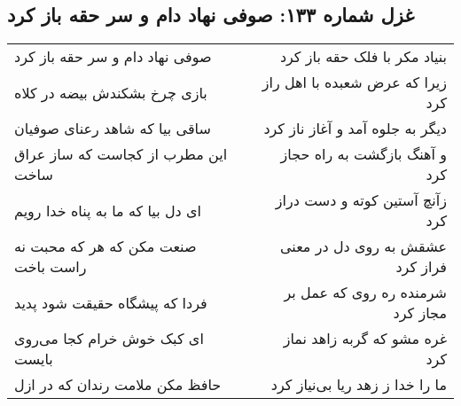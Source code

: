 \begin{center}
\section*{غزل شماره ۱۳۳: صوفی نهاد دام و سر حقه باز کرد}
\label{sec:sh133}
\begin{longtable}{l p{0.5cm} r}
صوفی نهاد دام و سر حقه باز کرد
&&
بنیاد مکر با فلک حقه باز کرد
\\
بازی چرخ بشکندش بیضه در کلاه
&&
زیرا که عرض شعبده با اهل راز کرد
\\
ساقی بیا که شاهد رعنای صوفیان
&&
دیگر به جلوه آمد و آغاز ناز کرد
\\
این مطرب از کجاست که ساز عراق ساخت
&&
و آهنگ بازگشت به راه حجاز کرد
\\
ای دل بیا که ما به پناه خدا رویم
&&
زآنچ آستین کوته و دست دراز کرد
\\
صنعت مکن که هر که محبت نه راست باخت
&&
عشقش به روی دل در معنی فراز کرد
\\
فردا که پیشگاه حقیقت شود پدید
&&
شرمنده ره روی که عمل بر مجاز کرد
\\
ای کبک خوش خرام کجا می‌روی بایست
&&
غره مشو که گربه زاهد نماز کرد
\\
حافظ مکن ملامت رندان که در ازل
&&
ما را خدا ز زهد ریا بی‌نیاز کرد
\\
\end{longtable}
\end{center}
